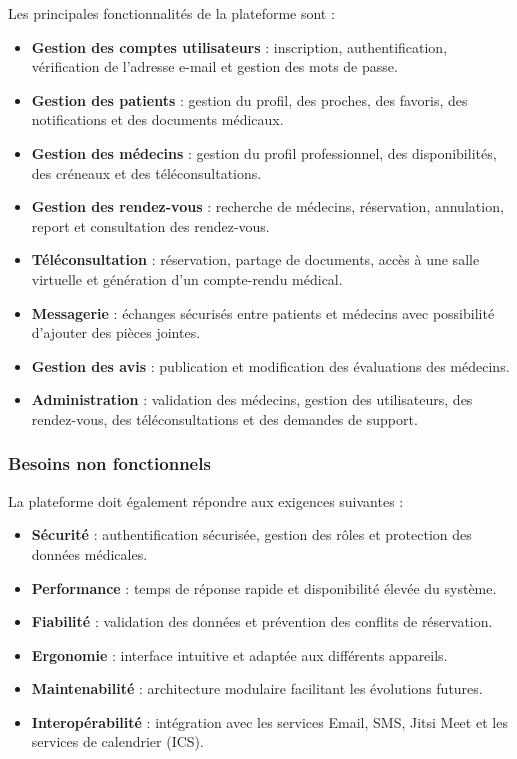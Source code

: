 \documentclass[12pt,a4paper]{report}
\begin{document}
Les principales fonctionnalit\'es de la plateforme sont :

\begin{itemize}
    \item \textbf{Gestion des comptes utilisateurs} : inscription, authentification, v\'erification de l'adresse e-mail et gestion des mots de passe.
    \item \textbf{Gestion des patients} : gestion du profil, des proches, des favoris, des notifications et des documents m\'edicaux.
    \item \textbf{Gestion des m\'edecins} : gestion du profil professionnel, des disponibilit\'es, des cr\'eneaux et des t\'el\'econsultations.
    \item \textbf{Gestion des rendez-vous} : recherche de m\'edecins, r\'eservation, annulation, report et consultation des rendez-vous.
    \item \textbf{T\'el\'econsultation} : r\'eservation, partage de documents, acc\`es \`a une salle virtuelle et g\'en\'eration d'un compte-rendu m\'edical.
    \item \textbf{Messagerie} : \'echanges s\'ecuris\'es entre patients et m\'edecins avec possibilit\'e d'ajouter des pi\`eces jointes.
    \item \textbf{Gestion des avis} : publication et modification des \'evaluations des m\'edecins.
    \item \textbf{Administration} : validation des m\'edecins, gestion des utilisateurs, des rendez-vous, des t\'el\'econsultations et des demandes de support.
\end{itemize}

\subsubsection*{Besoins non fonctionnels}

La plateforme doit \'egalement r\'epondre aux exigences suivantes :

\begin{itemize}
    \item \textbf{S\'ecurit\'e} : authentification s\'ecuris\'ee, gestion des r\^oles et protection des donn\'ees m\'edicales.
    \item \textbf{Performance} : temps de r\'eponse rapide et disponibilit\'e \'elev\'ee du syst\`eme.
    \item \textbf{Fiabilit\'e} : validation des donn\'ees et pr\'evention des conflits de r\'eservation.
    \item \textbf{Ergonomie} : interface intuitive et adapt\'ee aux diff\'erents appareils.
    \item \textbf{Maintenabilit\'e} : architecture modulaire facilitant les \'evolutions futures.
    \item \textbf{Interop\'erabilit\'e} : int\'egration avec les services Email, SMS, Jitsi Meet et les services de calendrier (ICS).
\end{itemize}
\end{document}
